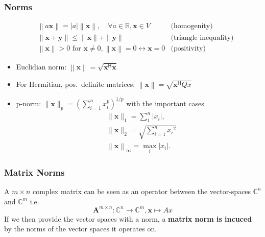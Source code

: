 \subsubsection{Norms}

\begin{align*}
     & \left\| a\mathbf{x}\right\|  =\left|a\right|\left\|\mathbf{x}\right\|,\quad\forall a\in\mathbb{R},\mathbf{x}\in V                 & \text{(homogenity)}          \\
     & \|\mathbf{x}+\mathbf{y}\|                         \leq\|\mathbf{x}\|+\|\mathbf{y}\|                                               & \text{(triangle inequality)} \\
     & \left\|\mathbf{x}\right\|                >0 \text{ for } \mathbf{x}\neq0, \left\|\mathbf{x}\right\|=0\leftrightarrow \mathbf{x}=0 & \text{(positivity)}
\end{align*}

\begin{itemize}
    \item Euclidian norm: $\left\|\mathbf{x}\right\|=\sqrt{\mathbf{x}^{\mathsf{H}}\mathbf{x}}$
    \item For Hermitian, pos.\ definite matrices: $\left\|\mathbf{x}\right\|=\sqrt{\mathbf{x}^{\mathsf{H}} Qx}$
    \item p-norm: $\|\mathbf{x}\|_p{=\left(\sum_{i=1}^n x_i^p\right)}^{1/p}$ with the important cases
          \begin{align*}
               & \|\mathbf{x}\|_1=\sum_1^n\left|x_i\right|,               \\
               & \|\mathbf{x}\|_2=\sqrt{\sum_{i=1}^n {x_i}^2}             \\
               & \left\|\mathbf{x}\right\|_\infty=\max_i\left|x_i\right|.
          \end{align*}
\end{itemize}

\subsubsection{Matrix Norms}
A $m\times n$ complex matrix can be seen as an operator between the vector-spaces $\mathbb{C}^n$ and $\mathbb{C}^m$ i.e.
\begin{equation*}
    \mathbf{A}^{m\times n}:\mathbb{C}^n\to\mathbb{C}^m,\mathbf{x}\mapsto Ax
\end{equation*}
If we then provide the vector spaces with a norm, a \textbf{matrix norm is incuced} by the norms of the vector spaces it operates on.

